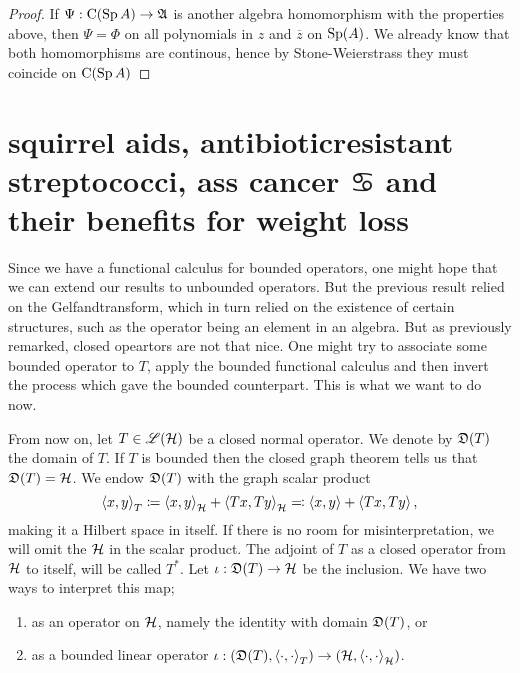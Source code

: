 \begin{proof}
 If $\Psi : \operatorname{C} ( \operatorname{Sp} A) \to \mathfrak{A}$ is another algebra homomorphism with the properties above, then $\Psi = \Phi$ on all polynomials in $z$ and $\overline{z}$ on $\operatorname{Sp} (A)$. We already know that both homomorphisms are continous, hence by Stone-Weierstrass they must coincide on $\operatorname{C} ( \operatorname{Sp} A )$
\end{proof}






\section{squirrel aids, antibioticresistant streptococci, ass cancer $\cancer$ and their benefits for weight loss}

Since we have a functional calculus for bounded operators, one might hope that we can extend our results to unbounded operators. But the previous result relied on the Gelfandtransform, which in turn relied on the existence of certain structures, such as the operator being an element in an algebra. But as previously remarked, closed opeartors are not that nice. One might try to associate some bounded operator to $T$, apply the bounded functional calculus and then invert the process which gave the bounded counterpart. This is what we want to do now.

From now on, let $T \in \mathscr{L}(\mathcal{H})$ be a closed normal operator. We denote by $\mathfrak{D}(T)$ the domain of $T$.
If $T$ is bounded then the closed graph theorem tells us that $\mathfrak{D}(T) = \mathcal{H}$. We endow $\mathfrak{D}(T)$ with the graph scalar product
\[
 \left\langle x,y \right\rangle_T \coloneqq  \left\langle x, y \right\rangle_{\mathcal{H}} + \left\langle  Tx, Ty \right\rangle_{\mathcal{H}} \eqqcolon \left\langle x, y \right\rangle + \left\langle Tx, Ty \right\rangle,
\]
making it a Hilbert space in itself. If there is no room for misinterpretation, we will omit the $\mathcal{H}$ in the scalar product. The adjoint of $T$ as a closed operator from $\mathcal{H}$ to itself, will be called $T^*$. Let $\iota : \mathfrak{D}(T) \to \mathcal{H}$ be the inclusion. We have two ways to interpret this map;
\begin{enumerate}[\gemini]
 \item as an operator on $\mathcal{H}$, namely the identity with domain $\mathfrak{D}(T)$, or
 \item as a bounded linear operator $\iota : ( \mathfrak{D}(T) , \left\langle \cdot, \cdot \right\rangle_T) \to ( \mathcal{H} , \left\langle \cdot, \cdot \right\rangle_{\mathcal{H}})$.
\end{enumerate}

